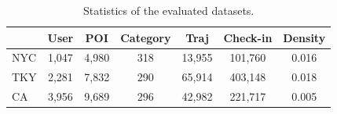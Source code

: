 \begin{table}[ht]
\captionsetup{aboveskip=0pt, belowskip=-3pt}
\centering
\caption{Statistics of the evaluated datasets.}
\renewcommand{\arraystretch}{1.2}
\begin{tabular}{lcccccc}
    \toprule
    & User & POI & Category & Traj & Check-in & Density \\
    \midrule
    \rowcolor{NYCband} NYC & 1,047 & 4,980 & 318 & 13,955 & 101,760 & 0.016 \\
    \rowcolor{TKYband} TKY & 2,281 & 7,832 & 290 & 65,914 & 403,148 & 0.018 \\
    \rowcolor{CAband}  CA  & 3,956 & 9,689 & 296 & 42,982 & 221,717 & 0.005 \\
    \bottomrule
\end{tabular}%
\label{tab:data_summary}
\end{table}
